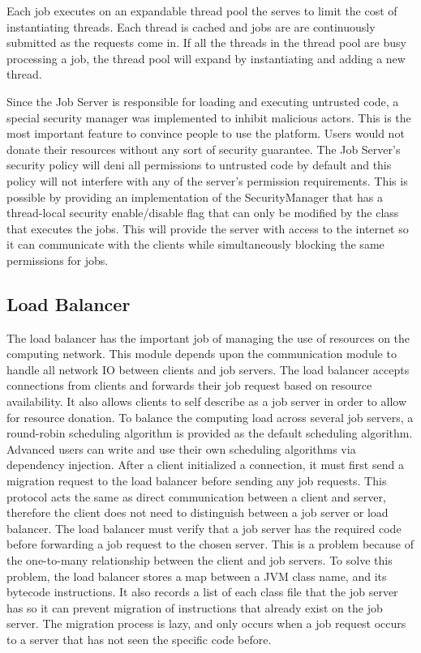 Each job executes on an expandable thread pool the serves to limit
the cost of instantiating threads. Each thread is cached and jobs
are are continuously submitted as the requests come in. If all the threads
in the thread pool are busy processing a job, the thread pool will
expand by instantiating and adding a new thread.

Since the Job Server is responsible for loading and executing untrusted
code, a special security manager was implemented to inhibit malicious actors.
This is the most important feature to convince people to use the platform.
Users would not donate their resources without any sort of security guarantee.
The Job Server's security policy will deni all permissions to untrusted code
by default and this policy will not interfere with any of the server's
permission requirements. This is possible by providing an implementation
of the SecurityManager that has a thread-local security enable/disable flag
that can only be modified by the class that executes the jobs. This will provide
the server with access to the internet so it can communicate with the clients
while simultaneously blocking the same permissions for jobs.

\subsection{Load Balancer}\label{subsec:modules}

The load balancer has the important job of managing the use of resources
on the computing network.
This module depends upon the communication module to handle all network IO
between clients and job servers.
The load balancer accepts connections from clients and forwards their job
request based on resource availability.
It also allows clients to self describe as a job server in order to allow for
resource donation.
To balance the computing load across several job servers, a round-robin
scheduling algorithm is provided as the default scheduling algorithm.
Advanced users can write and use their own scheduling algorithms via dependency
injection.
After a client initialized a connection, it must first send a migration request
to the load balancer before sending any job requests.
This protocol acts the same as direct communication between a client and server,
therefore the client does not need to distinguish between a job server or load
balancer.
The load balancer must verify that a job server has the required
code before forwarding a job request to the chosen server.
This is a problem because of the one-to-many relationship between the client
and job servers.
To solve this problem, the load balancer stores a map between
a JVM class name, and its bytecode instructions.
It also records a list of each class file that the job server has so it can
prevent migration of instructions that already exist on the job server.
The migration process is lazy, and only occurs when a job request
occurs to a server that has not seen the specific code before.
